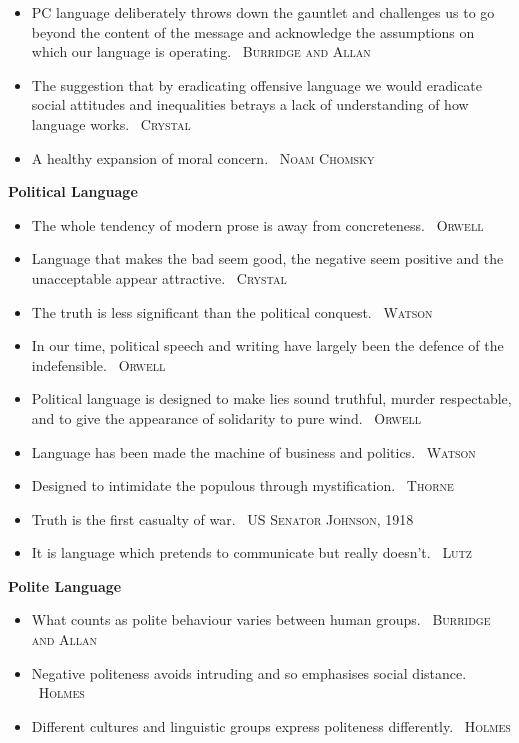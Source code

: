 \documentclass[a4paper]{article}
\newcommand{\heading}[1]{\textbf{#1}}
\newcommand{\linguist}[1]{\textemdash~\textsc{#1}}
\begin{document}
\begin{multicols}{2}
\begin{itemize}
    \item PC language deliberately throws down the gauntlet and challenges us to go beyond the content of the message and acknowledge the assumptions on which our language is operating. \linguist{Burridge and Allan}
    \item The suggestion that by eradicating offensive language we would eradicate social attitudes and inequalities betrays a lack of understanding of how language works. \linguist{Crystal}
    \item A healthy expansion of moral concern. \linguist{Noam Chomsky}
  \end{itemize}
  \heading{Political Language}
  \begin{itemize}
    \item The whole tendency of modern prose is away from concreteness. \linguist{Orwell}
    \item Language that makes the bad seem good, the negative seem positive and the unacceptable appear attractive. \linguist{Crystal}
    \item The truth is less significant than the political conquest. \linguist{Watson}
    \item In our time, political speech and writing have largely been the defence of the indefensible. \linguist{Orwell}
    \item Political language is designed to make lies sound truthful, murder respectable, and to give the appearance of solidarity to pure wind. \linguist{Orwell}
    \item Language has been made the machine of business and politics. \linguist{Watson}
      \item Designed to intimidate the populous through mystification. \linguist{Thorne}
      \item Truth is the first casualty of war. \linguist{US Senator Johnson, 1918}
      \item It is language which pretends to communicate but really doesn't. \linguist{Lutz}
  \end{itemize}
  \heading{Polite Language}
  \begin{itemize}
    \item What counts as polite behaviour varies between human groups. \linguist{Burridge and Allan}
    \item Negative politeness avoids intruding and so emphasises social distance. \linguist{Holmes}
    \item Different cultures and linguistic groups express politeness differently. \linguist{Holmes}
  \end{itemize}
\end{multicols}
\end{document}
